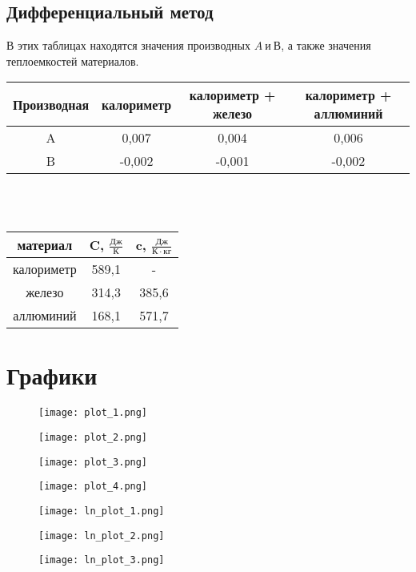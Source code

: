 \documentclass[a4paper, 12pt]{article}
\begin{document}
\subsection{Дифференциальный метод}
В этих таблицах находятся значения производных \(A \ и \ В\), а также значения теплоемкостей материалов.
\begin{table}[h]
    \begin{center}
        
    \begin{tabular}{|c|c|c|c|}
    \hline
        Производная & калориметр & калориметр + железо & калориметр + аллюминий \\
    \hline
         A &  0,007  & 0,004   & 0,006\\
    \hline
         B &  -0,002 & -0,001 & -0,002\\
    \hline
    \end{tabular}
    \end{center}
    \\
    \\
    \begin{center}
        \begin{tabular}{|c|c|c|}
        \hline
             материал   & C, \(\frac{Дж}{К}\) & c, \(\frac{Дж}{К \cdot кг}\)\\
        \hline
             калориметр &  589,1   & -\\
             железо     &  314,3   & 385,6\\
             аллюминий  &  168,1   & 571,7\\
        \hline    
    \end{tabular}  
    \end{center}
\end{table}
\newpage
\section{Графики}
\begin{figure}[h]
    \centering
    \texttt{[image: plot\_1.png]}
\end{figure}
\begin{figure}[h]
    \centering
    \texttt{[image: plot\_2.png]}
\end{figure}
\begin{figure}[h]
    \centering
    \texttt{[image: plot\_3.png]}
\end{figure}
\begin{figure}[h]
    \centering
    \texttt{[image: plot\_4.png]}
\end{figure}
\begin{figure}[h]
    \centering
    \texttt{[image: ln\_plot\_1.png]}
\end{figure}
\begin{figure}[h]
    \centering
    \texttt{[image: ln\_plot\_2.png]}
\end{figure}
\begin{figure}[h]
    \centering
    \texttt{[image: ln\_plot\_3.png]}
\end{figure}
\end{document}
